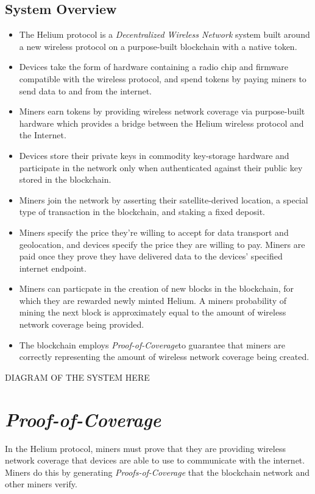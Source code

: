 \documentclass[letterpaper,11pt]{report}
\newcommand{\proofofcoverage}{\textit{Proof-of-Coverage}}
\begin{document}
\subsection{System Overview}

\begin{itemize}
	\item The Helium protocol is a \textit{Decentralized Wireless Network} system built around a new wireless protocol on a purpose-built blockchain with a native token. 
	\item Devices take the form of hardware containing a radio chip and firmware compatible with the wireless protocol, and spend tokens by paying miners to send data to and from the internet. 
	\item Miners earn tokens by providing wireless network coverage via purpose-built hardware which provides a bridge between the Helium wireless protocol and the Internet.
	\item Devices store their private keys in commodity key-storage hardware and participate in the network only when authenticated against their public key stored in the blockchain.
	\item Miners join the network by asserting their satellite-derived location, a special type of transaction in the blockchain, and staking a fixed deposit.
	\item Miners specify the price they're willing to accept for data transport and geolocation, and devices specify the price they are willing to pay. Miners are paid once they prove they have delivered data to the devices' specified internet endpoint.
	\item Miners can particpate in the creation of new blocks in the blockchain, for which they are rewarded newly minted Helium. A miners probability of mining the next block is approximately equal to the amount of wireless network coverage being provided.
	\item The blockchain employs \proofofcoverage to guarantee that miners are correctly representing the amount of wireless network coverage being created.
\end{itemize}

DIAGRAM OF THE SYSTEM HERE

\section{\proofofcoverage}

In the Helium protocol, miners must prove that they are providing wireless network coverage that devices are able to use to communicate with the internet. Miners do this by generating \textit{Proofs-of-Coverage} that the blockchain network and other miners verify.\newline
\end{document}
